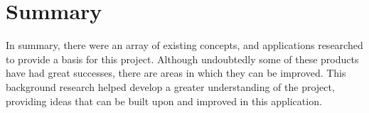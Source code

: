 \section{Summary}

In summary, there were an array of existing concepts, and applications researched to provide a basis for this project. Although undoubtedly some of these products have had great successes, there are areas in which they can be improved. This background research helped develop a greater understanding of the project, providing ideas that can be built upon and improved in this application.